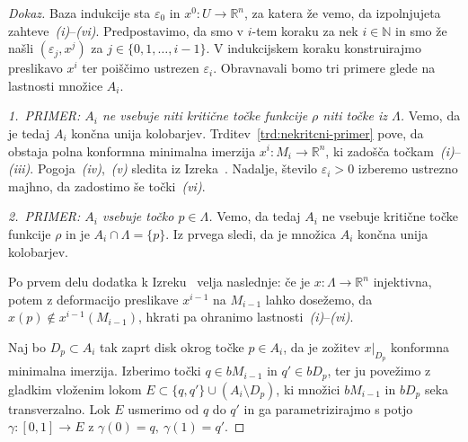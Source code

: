 \documentclass[12pt,a4paper,twoside]{article}
\theoremstyle{definition} %
\newenvironment{dokaz}[1][Dokaz]{\begin{proof}[#1]}{\end{proof}}
\theoremstyle{plain} %
\numberwithin{equation}{section}  %
\begin{document}
\begin{dokaz}
Baza indukcije sta $\varepsilon_0$ in $x^{0} \colon U \to \mathbb{R}^{n}$, za katera že vemo, da izpolnjujeta zahteve~\textit{(i)}--\textit{(vi)}. \newline
Predpostavimo, da smo v $i$-tem koraku za nek $i \in \mathbb{N}$ in smo že našli $(\varepsilon_{j}, x^{j})$ za $j \in \{ 0, 1, \dots , i-1 \}$. V indukcijskem koraku konstruirajmo preslikavo $x^{i}$ ter poiščimo ustrezen $\varepsilon_{i}$.
Obravnavali bomo tri primere glede na lastnosti množice $A_{i}$. \newline

\textit{1.~PRIMER: $A_{i}$ ne vsebuje niti kritične točke funkcije $\rho$ niti točke iz $\Lambda$.} \newline
Vemo, da je tedaj $A_{i}$ končna unija kolobarjev. Trditev~\ref{trd:nekritcni-primer} pove, da obstaja polna konformna minimalna imerzija $x^{i} \colon M_{i} \to \mathbb{R}^{n}$, ki zadošča točkam~\textit{(i)}--\textit{(iii)}.
Pogoja~\textit{(iv)},~\textit{(v)} sledita iz Izreka~\cite[Theorem~3.4.1]{alarcon2021minimal}.
Nadalje, število $\varepsilon_{i} > 0$ izberemo ustrezno majhno, da zadostimo še točki~\textit{(vi)}. \newline

\textit{2.~PRIMER: $A_{i}$ vsebuje točko $p \in \Lambda$.} \newline
Vemo, da tedaj $A_{i}$ ne vsebuje kritične točke funkcije $\rho$ in je $A_{i} \cap \Lambda = \{p\}$. Iz prvega sledi, da je množica $A_{i}$ končna unija kolobarjev.

Po prvem delu dodatka k Izreku~\cite[Theorem~3.4.1]{alarcon2021minimal}
velja naslednje: če je $x \colon \Lambda \to \mathbb{R}^{n}$ injektivna, potem z deformacijo preslikave $x^{i-1}$ na $M_{i-1}$ lahko dosežemo, da $x(p) \notin x^{i-1}(M_{i-1})$, hkrati pa ohranimo lastnosti~\textit{(i)}--\textit{(vi)}.

Naj bo $D_{p} \subset A_{i}$ tak zaprt disk okrog točke $p \in A_{i}$, da je zožitev $x|_{D_{p}}$ konformna minimalna imerzija.
Izberimo točki $q \in bM_{i-1}$ in $q' \in bD_{p}$, ter ju povežimo z gladkim vloženim lokom $E \subset \{q,q'\} \cup (A_{i} \setminus D_{p})$, ki množici $bM_{i-1}$ in $bD_{p}$ seka transverzalno. Lok $E$ usmerimo od $q$ do $q'$ in ga parametrizirajmo s potjo $\gamma \colon [0,1] \to E$ z $\gamma(0)=q, \ \gamma(1)=q'$.


\end{dokaz}
\end{document}
